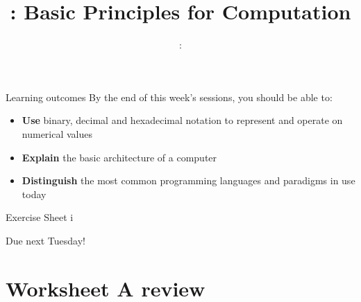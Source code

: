 \usepackage{../../beamerthemeFalmouthGamesAcademy}
\usepackage{multimedia}
\graphicspath{ {../../} }

\lstset{language=Python
}

\usepackage[normalem]{ulem}
\usepackage{wasysym}

\usepackage{pdfpages}

\usetikzlibrary{arrows,automata}




\title{\sessionnumber: Basic Principles for Computation}
\subtitle{\modulecode: \moduletitle}

\frame{\titlepage} 

\begin{frame}{Learning outcomes}
	By the end of this week's sessions, you should be able to:
	\begin{itemize}
		\item \textbf{Use} binary, decimal and hexadecimal notation to represent and operate on numerical values
		\item \textbf{Explain} the basic architecture of a computer
		\item \textbf{Distinguish} the most common programming languages and paradigms in use today
	\end{itemize}
\end{frame}





\begin{frame}{Exercise Sheet i}
   \begin{center}
       Due next Tuesday!
   \end{center}
\end{frame}



\part{Worksheet A review}
\frame{\partpage}


